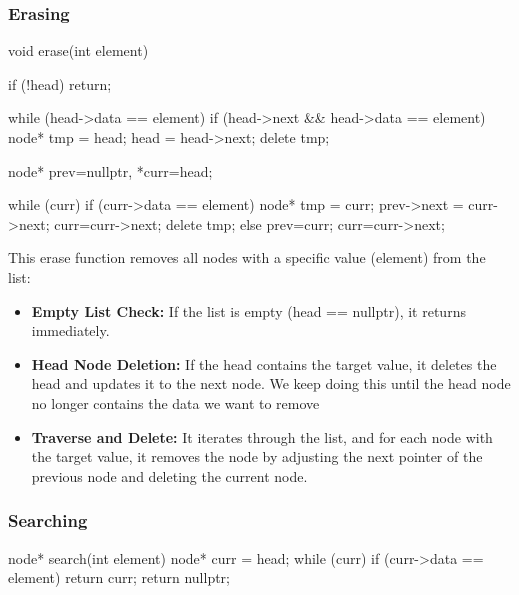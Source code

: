\documentclass{report}
\begin{document}
    \subsubsection{Erasing}
    \bigbreak \noindent 
    \begin{cppcode}
        void erase(int element) {
            if (!head) return;

            while (head->data == element) {
                if (head->next && head->data == element) {
                    node* tmp = head;
                    head = head->next;
                    delete tmp;
                }
            }

            node* prev=nullptr, *curr=head;

            while (curr) {
                if (curr->data == element) {
                    node* tmp = curr;
                    prev->next = curr->next;
                    curr=curr->next;
                    delete tmp;
                } else {
                    prev=curr;
                    curr=curr->next;
                }
            }
        }
    \end{cppcode}
    \bigbreak \noindent 
    This erase function removes all nodes with a specific value (element) from the list:
    \begin{itemize}
        \item \textbf{Empty List Check:} If the list is empty (head == nullptr), it returns immediately.
        \item \textbf{Head Node Deletion:} If the head contains the target value, it deletes the head and updates it to the next node. We keep doing this until the head node no longer contains the data we want to remove
        \item \textbf{Traverse and Delete:} It iterates through the list, and for each node with the target value, it removes the node by adjusting the next pointer of the previous node and deleting the current node.
    \end{itemize}


    \pagebreak 
    \subsubsection{Searching}
    \bigbreak \noindent 
    \begin{cppcode}
        node* search(int element) {
            node* curr = head;
            while (curr) {
                if (curr->data == element) {
                    return curr;
                }
            }
            return nullptr;
        }
    \end{cppcode}
\end{document}

